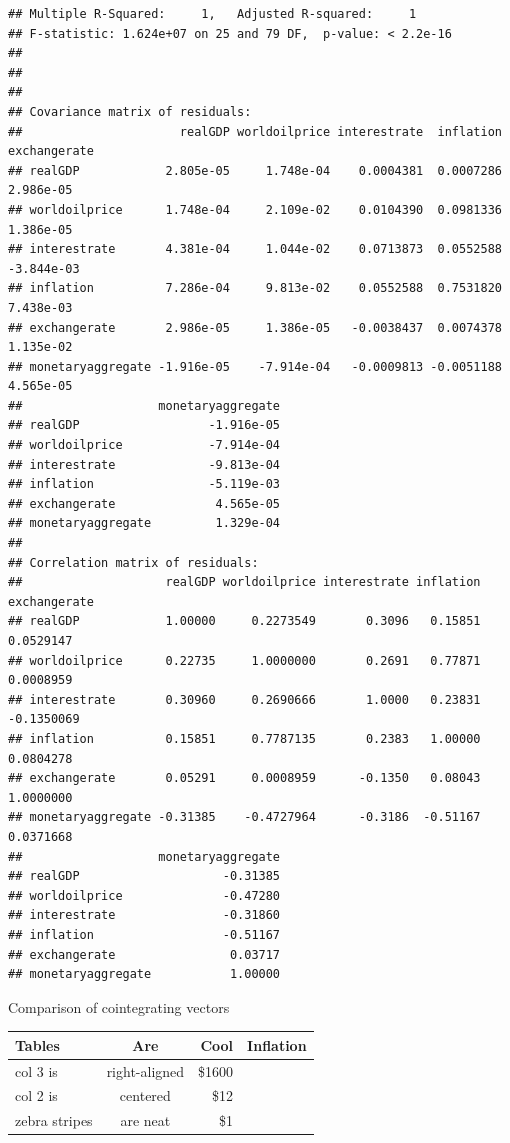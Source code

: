 \documentclass[11pt,preprint, authoryear]{elsarticle}
\numberwithin{equation}{section}
\numberwithin{figure}{section}
\numberwithin{table}{section}
\begin{document}
\begin{verbatim}
## Multiple R-Squared:     1,   Adjusted R-squared:     1 
## F-statistic: 1.624e+07 on 25 and 79 DF,  p-value: < 2.2e-16 
## 
## 
## 
## Covariance matrix of residuals:
##                      realGDP worldoilprice interestrate  inflation exchangerate
## realGDP            2.805e-05     1.748e-04    0.0004381  0.0007286    2.986e-05
## worldoilprice      1.748e-04     2.109e-02    0.0104390  0.0981336    1.386e-05
## interestrate       4.381e-04     1.044e-02    0.0713873  0.0552588   -3.844e-03
## inflation          7.286e-04     9.813e-02    0.0552588  0.7531820    7.438e-03
## exchangerate       2.986e-05     1.386e-05   -0.0038437  0.0074378    1.135e-02
## monetaryaggregate -1.916e-05    -7.914e-04   -0.0009813 -0.0051188    4.565e-05
##                   monetaryaggregate
## realGDP                  -1.916e-05
## worldoilprice            -7.914e-04
## interestrate             -9.813e-04
## inflation                -5.119e-03
## exchangerate              4.565e-05
## monetaryaggregate         1.329e-04
## 
## Correlation matrix of residuals:
##                    realGDP worldoilprice interestrate inflation exchangerate
## realGDP            1.00000     0.2273549       0.3096   0.15851    0.0529147
## worldoilprice      0.22735     1.0000000       0.2691   0.77871    0.0008959
## interestrate       0.30960     0.2690666       1.0000   0.23831   -0.1350069
## inflation          0.15851     0.7787135       0.2383   1.00000    0.0804278
## exchangerate       0.05291     0.0008959      -0.1350   0.08043    1.0000000
## monetaryaggregate -0.31385    -0.4727964      -0.3186  -0.51167    0.0371668
##                   monetaryaggregate
## realGDP                    -0.31385
## worldoilprice              -0.47280
## interestrate               -0.31860
## inflation                  -0.51167
## exchangerate                0.03717
## monetaryaggregate           1.00000
\end{verbatim}

Comparison of cointegrating vectors

\begin{longtable}[]{@{}lcrr@{}}
\toprule
Tables & Are & Cool & Inflation \\
\midrule
\endhead
col 3 is & right-aligned & \$1600 & \\
col 2 is & centered & \$12 & \\
zebra stripes & are neat & \$1 & \\
\bottomrule
\end{longtable}
\end{document}
